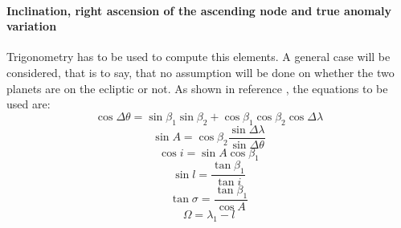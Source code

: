 \paragraph{Inclination, right ascension of the ascending node and true anomaly variation}
Trigonometry has to be used to compute this elements. A general case will be considered, that is to say, that no assumption will be done on whether the two planets are on the ecliptic or not. As shown in reference \cite{PCA}, the equations to be used are: 
\begin{equation}
\cos \Delta\theta = \sin\beta _1 \sin\beta _2 + \cos\beta _1 \cos\beta _2 \cos\Delta\lambda
\end{equation} 
\begin{equation}
\sin A=\cos\beta _2 \frac{\sin\Delta\lambda}{\sin\Delta\theta}
\end{equation}
\begin{equation}
\cos i=\sin A\cos\beta_1
\end{equation}
\begin{equation}
\sin l=\frac{\tan\beta _1}{\tan i}
\end{equation}
\begin{equation}
\tan \sigma = \frac{\tan \beta _1}{\cos A}
\end{equation}
\begin{equation}
\Omega = \lambda _1-l
\end{equation}
